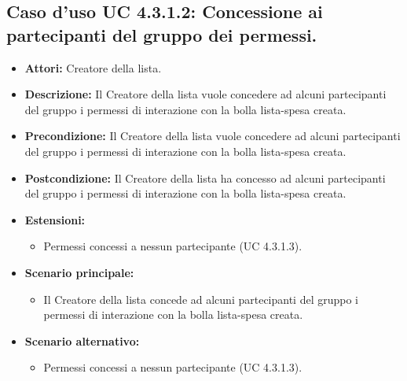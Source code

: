 \subsection{Caso d'uso UC 4.3.1.2: Concessione ai partecipanti del gruppo dei permessi.}
\label{Caso d'uso UC 4.3.1.2: Concessione ai partecipanti del gruppo dei permessi.}

\FloatBarrier
\begin{itemize}
\item \textbf{Attori:} Creatore della lista.
\item \textbf{Descrizione:} Il Creatore della lista vuole concedere ad alcuni partecipanti del gruppo i permessi di interazione con la bolla lista-spesa creata.
\item \textbf{Precondizione:} Il Creatore della lista vuole concedere ad alcuni partecipanti del gruppo i permessi di interazione con la bolla lista-spesa creata. 
\item \textbf{Postcondizione:} Il Creatore della lista ha concesso ad alcuni partecipanti del gruppo i permessi di interazione con la bolla lista-spesa creata.
\item \textbf{Estensioni:}
	\begin{itemize}
	\item{Permessi concessi a nessun partecipante (UC 4.3.1.3).}
	\end{itemize}
\item \textbf{Scenario principale:}
\begin{itemize}
\item Il Creatore della lista concede ad alcuni partecipanti del gruppo i permessi di interazione con la bolla lista-spesa creata.
\end{itemize}
\item \textbf{Scenario alternativo:}
	\begin{itemize}
	\item{Permessi concessi a nessun partecipante (UC 4.3.1.3).}
	\end{itemize}
\end{itemize}
